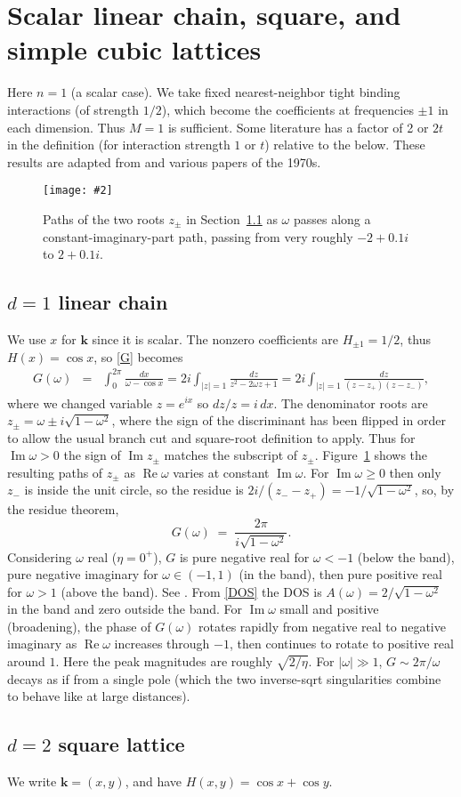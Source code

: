 \documentclass[11pt]{article}
\newcommand{\bea}{\begin{eqnarray}}
\newcommand{\eea}{\end{eqnarray}}
\newcommand{\bfi}{\begin{figure}}
\newcommand{\efi}{\end{figure}}
\newcommand{\ca}[2]{\caption{#1 \label{#2}}}
\newcommand{\ig}[2]{\texttt{[image: \#2]}}
\newcommand{\mbf}[1]{{\mathbf #1}}
\DeclareMathOperator{\re}{Re}
\DeclareMathOperator{\im}{Im}
\newcommand{\om}{\omega}
\newcommand{\kk}{\mbf{k}}
\begin{document}
\section{Scalar linear chain, square, and simple cubic lattices}

Here $n=1$ (a scalar case). We take fixed
nearest-neighbor tight binding interactions (of strength $1/2$), which become
the coefficients at frequencies $\pm 1$ in each dimension.
Thus $M=1$ is sufficient.
Some literature has
a factor of 2 or $2t$ in the definition (for interaction strength $1$ or $t$) relative to the below.
These results are adapted from \cite[Ch.~5]{economou}
and various papers of the 1970s.


\bfi %
\centering
\ig{width=3.5in}{zpaths}    %
\ca{Paths of the two roots $z_\pm$ in Section~\ref{s:1d} as
  $\om$ passes along a constant-imaginary-part
  path, passing from very roughly $-2+0.1i$ to $2+0.1i$.}{f:zpaths}
\efi

\subsection{$d=1$ linear chain}
\label{s:1d}

We use $x$ for $\kk$ since it is scalar.
The nonzero coefficients are $H_{\pm 1} = 1/2$,
thus $H(x) = \cos x$,
so \eqref{G} becomes
\bea
G(\om) &=& \int_0^{2\pi} \frac{dx}{\om - \cos x}
= 2i \int_{|z|=1} \frac{dz}{z^2-2\om z + 1}
= 2i \int_{|z|=1} \frac{dz}{(z-z_+)(z-z_-)},
\nonumber
\eea
where we changed variable $z = e^{ix}$ so $dz/z = i\,dx$.
The denominator roots are $z_\pm = \om\pm i\sqrt{1-\om^2}$, where
the sign of the discriminant has been flipped in order to allow
the usual branch cut and square-root definition to apply.
Thus for $\im \om > 0$ the sign of $\im z_\pm$
matches the subscript of $z_\pm$.
Figure~\ref{f:zpaths} shows the resulting paths of $z_\pm$ as $\re \om$
varies at constant $\im \om$.
For $\im \om \ge 0$ then only $z_-$ is inside the unit circle, so
the residue is $2i/(z_--z_+) = -1/\sqrt{1-\om^2}$, so, by
the residue theorem,
\[
G(\om) \;=\; \frac{2\pi}{i \sqrt{1-\om^2}}.
\]
Considering $\om$ real ($\eta=0^+$),
$G$ is pure negative real for $\om<-1$ (below the band),
pure negative imaginary for $\om \in (-1,1)$ (in the band),
then pure positive real for $\om>1$ (above the band).
See \cite[Fig.~5.6]{economou}.
From \eqref{DOS} the DOS is $A(\om) = 2/\sqrt{1-\om^2}$ in the band and zero
outside the band.
For $\im \om$ small and positive (broadening),
the phase of $G(\om)$ rotates rapidly from negative real to negative imaginary as
$\re\om$ increases through $-1$, then continues to rotate to positive real
around $1$.
Here the peak magnitudes are roughly $\sqrt{2/\eta}$.
For $|\om|\gg 1$, $G \sim 2\pi/\om$ decays as if from
a single pole (which the two inverse-sqrt singularities combine to
behave like at large distances).


\subsection{$d=2$ square lattice}
\label{s:2d}

We write $\kk=(x,y)$, and have $H(x,y) = \cos x + \cos y$.






\end{document}
